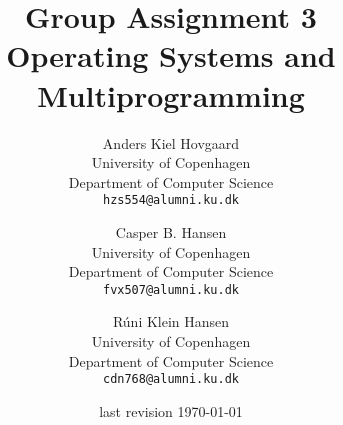 \documentclass[11pt]{article}
\title
{
    {\Large Group Assignment 3} \\
    Operating Systems and Multiprogramming
}
\author
{
    Anders Kiel Hovgaard \\
    University of Copenhagen \\
    Department of Computer Science \\
    {\tt hzs554@alumni.ku.dk}
    \and
    Casper B. Hansen \\
    University of Copenhagen \\
    Department of Computer Science \\
    {\tt fvx507@alumni.ku.dk}
    \and
    Rúni Klein Hansen \\
    University of Copenhagen \\
    Department of Computer Science \\
    {\tt cdn768@alumni.ku.dk}
}
\date{last revision \today}
\begin{document}
\clearpage
\maketitle
\thispagestyle{empty}
\begin{multicols}{2}
    \begin{abstract}
    
    \end{abstract}
    \vfill\columnbreak
    \tableofcontents\vfill
\end{multicols}
\newpage



\end{document}
